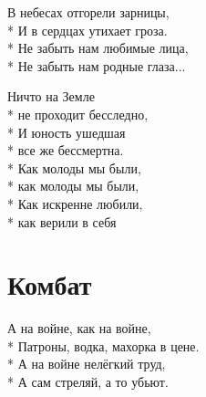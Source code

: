 \medskip

\begin{minipage}{\linewidth}
В небесах отгорели зарницы,\\*
И в сердцах утихает гроза.\\*
Не забыть нам любимые лица,\\*
Не забыть нам родные глаза...\\
\end{minipage}\par\medskip\nobreak

\medskip

\begin{minipage}{\linewidth}
\hspace*{1.5em}Ничто на Земле\\*
\hspace*{1.5em}не проходит бесследно,\\*
\hspace*{1.5em}И юность ушедшая\\*
\hspace*{1.5em}все же бессмертна.\\*
\hspace*{1.5em}Как молоды мы были,\\*
\hspace*{1.5em}как молоды мы были,\\*
\hspace*{1.5em}Как искренне любили,\\*
\hspace*{1.5em}как верили в себя\\
\end{minipage}

\vspace{\fill}\newpage

\section{Комбат}
\label{song:Комбат}

\medskip

\begin{minipage}{\linewidth}
А на войне, как на войне,\\*
Патроны, водка, махорка в цене.\\*
А на войне нелёгкий труд,\\*
А сам стреляй, а то убьют.\\
\end{minipage}\par\medskip\nobreak

